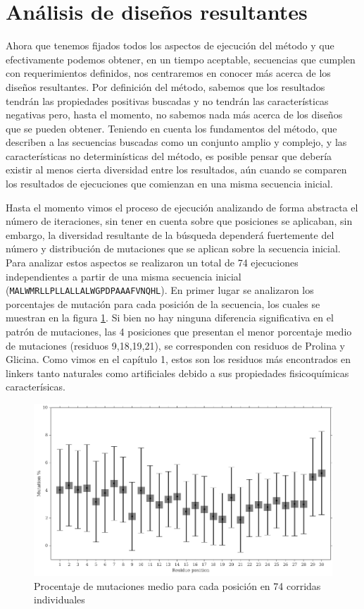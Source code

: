 \section{Análisis de diseños resultantes}

Ahora que tenemos fijados todos los aspectos de ejecución del método y que efectivamente podemos obtener, en un tiempo aceptable, secuencias que cumplen con requerimientos definidos, nos centraremos en 
conocer más acerca de los diseños resultantes.
Por definición del método, sabemos que los resultados tendrán las propiedades positivas buscadas y no tendrán las características negativas pero, hasta el momento, no sabemos nada más acerca de los diseños que se pueden obtener.
Teniendo en cuenta los fundamentos del método, que describen a las secuencias buscadas como un conjunto amplio y complejo, y las características no determinísticas del método,
es posible pensar que debería existir al menos cierta diversidad entre los resultados, aún cuando se comparen los resultados de ejecuciones que comienzan en una misma secuencia inicial.

Hasta el momento vimos el proceso de ejecución analizando de forma abstracta el número de iteraciones, sin tener en cuenta sobre que posiciones se aplicaban,
sin embargo, la diversidad resultante de la búsqueda dependerá fuertemente del número y distribución de mutaciones que se aplican sobre la secuencia inicial.
Para analizar estos aspectos se realizaron un total de 74 ejecuciones independientes a partir de una misma secuencia inicial (\texttt{MALWMRLLPLLALLALWGPDPAAAFVNQHL}).
En primer lugar se analizaron los porcentajes de mutación para cada posición de la secuencia, los cuales se muestran en la figura \ref{fig:mutationPerSite}.
Si bien no hay ninguna diferencia significativa en el patrón de mutaciones, las 4 posiciones que presentan el menor porcentaje medio de mutaciones (residuos 9,18,19,21),
se corresponden con residuos de Prolina y Glicina.
Como vimos en el capítulo 1, estos son los residuos más encontrados en linkers tanto naturales como artificiales debido a sus propiedades fisicoquímicas caracterísicas.

\begin{figure}[h]
\includegraphics[width=\textwidth]{img/resultados/mutationsPerPosition.png}
\caption{Procentaje de mutaciones medio para cada posición en 74 corridas individuales}
\label{fig:mutationPerSite}
\end{figure}


